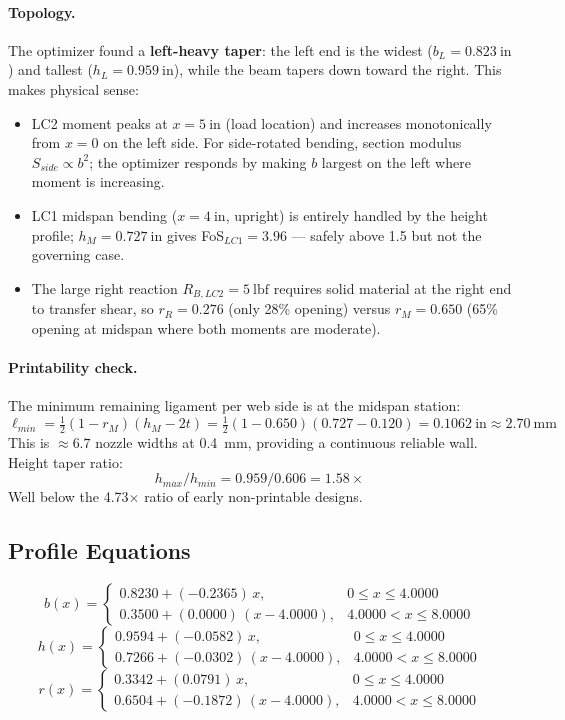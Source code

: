\documentclass[11pt,letterpaper]{article}
\begin{document}
\paragraph{Topology.}
The optimizer found a \textbf{left-heavy taper}: the left end is the widest
($b_L = 0.823\ \mathrm{in}$) and tallest ($h_L = 0.959\ \mathrm{in}$),
while the beam tapers down toward the right.  This makes physical sense:
\begin{itemize}[noitemsep]
  \item LC2 moment peaks at $x = 5\ \mathrm{in}$ (load location) and
    increases monotonically from $x = 0$ on the left side.  For side-rotated
    bending, section modulus $S_{side} \propto b^2$; the optimizer responds
    by making $b$ largest on the left where moment is increasing.
  \item LC1 midspan bending ($x = 4\ \mathrm{in}$, upright) is entirely
    handled by the height profile; $h_M = 0.727\ \mathrm{in}$ gives
    FoS$_{LC1} = 3.96$ --- safely above 1.5 but not the governing case.
  \item The large right reaction $R_{B,LC2} = 5\ \mathrm{lbf}$ requires
    solid material at the right end to transfer shear, so $r_R = 0.276$
    (only 28\% opening) versus $r_M = 0.650$ (65\% opening at midspan
    where both moments are moderate).
\end{itemize}

\paragraph{Printability check.}
The minimum remaining ligament per web side is at the midspan station:
\[
  \ell_{min} = \tfrac{1}{2}(1 - r_M)(h_M - 2t)
  = \tfrac{1}{2}(1 - 0.650)(0.727 - 0.120)
  = 0.1062\ \mathrm{in} \approx 2.70\ \mathrm{mm}
\]
This is $\approx 6.7$ nozzle widths at 0.4~mm, providing a continuous
reliable wall.  Height taper ratio:
\[
  h_{max}/h_{min} = 0.959 / 0.606 = 1.58\times
\]
Well below the 4.73$\times$ ratio of early non-printable designs.

\subsection{Profile Equations}

\[
b(x)=\begin{cases}0.8230 + (-0.2365)\,x, & 0 \le x \le 4.0000\\
     0.3500 + (0.0000)\,(x-4.0000), & 4.0000 < x \le 8.0000\end{cases}
\]
\[
h(x)=\begin{cases}0.9594 + (-0.0582)\,x, & 0 \le x \le 4.0000\\
     0.7266 + (-0.0302)\,(x-4.0000), & 4.0000 < x \le 8.0000\end{cases}
\]
\[
r(x)=\begin{cases}0.3342 + (0.0791)\,x, & 0 \le x \le 4.0000\\
     0.6504 + (-0.1872)\,(x-4.0000), & 4.0000 < x \le 8.0000\end{cases}
\]
\end{document}
